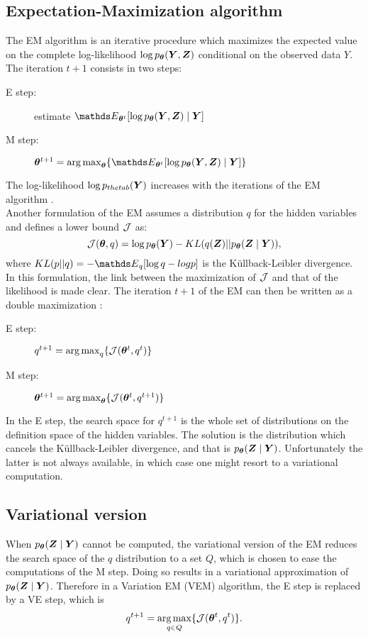  \subsection{Expectation-Maximization algorithm}
 The EM algorithm is an iterative procedure which maximizes the expected value on  the complete log-likelihood $\log p_{\boldsymbol{\theta}} ({\boldsymbol{Y}}, {\boldsymbol{Z}})$ conditional on the observed data $Y$. The iteration $t+1$ consists in two steps:
 \begin{description}
 \item [E step:] estimate $\Esp_{\thetab^t}[\log p_\thetab (\Ybf, \Zbf)\mid \Ybf]$
 \item [M step:] $\thetab^{t+1} = \argmax_\thetab \{ \Esp_{\thetab^t}[\log p_\thetab (\Ybf, \Zbf)\mid \Ybf]\}$
 \end{description} 
 The  log-likelihood $\log p_{thetab} ({\boldsymbol{Y}})$ increases with the iterations of the EM algorithm \citep{DLR77}. \\
 
 
 Another formulation of the EM assumes a distribution $q$ for the hidden variables \citep{NH98} and defines a  lower bound ${\mathcal{J}}$ as:
 $${\mathcal{J}}({\boldsymbol{\theta}}, q) = \log p_{\boldsymbol{\theta}} ({\boldsymbol{Y}}) - KL(q({\boldsymbol{Z}}) || p_{\boldsymbol{\theta}}({\boldsymbol{Z}}\mid{\boldsymbol{Y}})),$$
 where $KL(p||q) = -\Esp_q[\log q - log p]$ is the Küllback-Leibler divergence. In this formulation, the link between the maximization of ${\mathcal{J}}$ and that of the likelihood is made clear. The iteration $t+1$ of the EM can then be written as a double maximization :
  \begin{description}
 \item [E step:]  $q^{t+1}=\operatorname*{arg\,max}_q \{ {\mathcal{J}}({\boldsymbol{\theta}}^t, q^t)\}$
 \item [M step:] ${\boldsymbol{\theta}}^{t+1} = \operatorname*{arg\,max}_{\boldsymbol{\theta}} \{ {\mathcal{J}}({\boldsymbol{\theta}}^t, q^{t+1})\}$
 \end{description} 
 
In the E step, the search space for $q^{t+1}$ is the whole set of distributions on the definition space of the hidden variables. The solution is the distribution which cancels the Küllback-Leibler divergence, and that is $p_{\boldsymbol{\theta}}({\boldsymbol{Z}}\mid{\boldsymbol{Y}})$. Unfortunately the latter is not always available, in which case one might resort to a variational computation.
 

 \subsection{Variational version}
 When $p_{\boldsymbol{\theta}}({\boldsymbol{Z}}\mid{\boldsymbol{Y}})$ cannot be computed, the variational version of the EM reduces the search space of the $q$ distribution to a set $Q$, which is chosen to ease the computations of the M step. Doing so results in a variational approximation of $p_{\boldsymbol{\theta}}({\boldsymbol{Z}}\mid{\boldsymbol{Y}})$. Therefore in a  Variation EM (VEM) algorithm, the E step is replaced by a VE step, which is  
 $$q^{t+1}=\operatorname*{arg\,max}_{q\in Q} \{ {\mathcal{J}}({\boldsymbol{\theta}}^t, q^t)\}.$$
 
